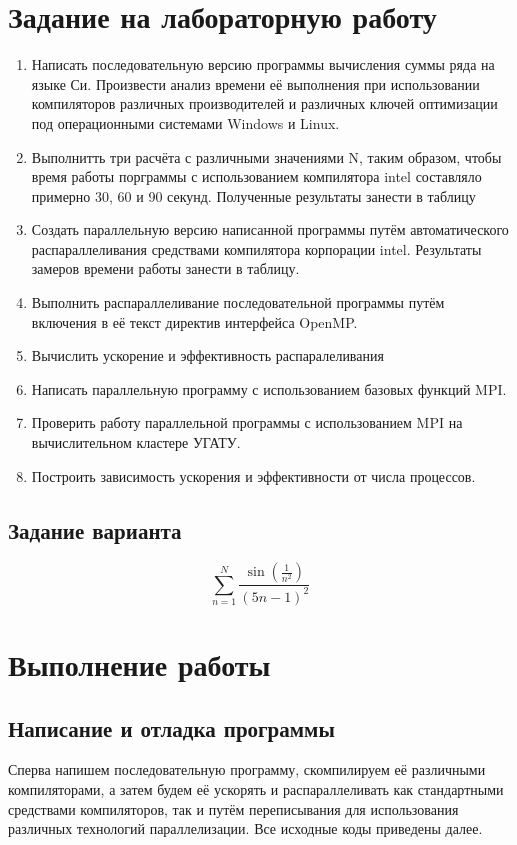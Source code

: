 \documentclass[a4paper,12pt]{article}
\begin{document}
\section{Задание на лабораторную работу}
\begin{enumerate}
 \item Написать последовательную версию программы вычисления суммы ряда на языке Си. Произвести анализ времени её выполнения при использовании компиляторов различных производителей и различных ключей оптимизации под операционными системами Windows и Linux.
 \item Выполнитть три расчёта с различными значениями N, таким образом, чтобы время работы порграммы с использованием компилятора intel составляло примерно 30, 60 и 90 секунд. Полученные результаты занести в таблицу
 \item Создать параллельную версию написанной программы путём автоматического распараллеливания средствами компилятора корпорации intel. Результаты замеров времени работы занести в таблицу.
 \item Выполнить распараллеливание последовательной программы путём включения в её текст директив интерфейса OpenMP.
 \item Вычислить ускорение и эффективность распаралеливания
 \item Написать параллельную программу с использованием базовых функций MPI.
 \item Проверить работу параллельной программы с использованием MPI на вычислительном кластере УГАТУ.
 \item Построить зависимость ускорения и эффективности от числа процессов.
\end{enumerate}
\subsection{Задание варианта}
$$\sum_{n=1}^N \frac{\sin(\frac{1}{n^2})}{(5n-1)^2}$$
\section{Выполнение работы}
\subsection{Написание и отладка программы}
Сперва напишем последовательную программу, скомпилируем её различными компиляторами, а затем будем её ускорять и распараллеливать как стандартными средствами компиляторов, так и путём переписывания для использования различных технологий параллелизации. Все исходные коды приведены далее.
\end{document}
